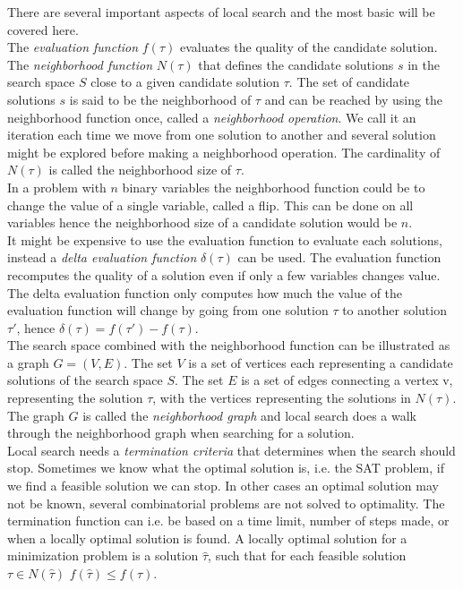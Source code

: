 There are several important aspects of local search and the most basic will be covered here. \\The \emph{evaluation 
function} $f(\tau)$ evaluates the quality of the candidate solution. 
The \emph{neighborhood function} $N(\tau)$ that defines the candidate solutions $s$ in the search space $S$ close to a 
given candidate solution $\tau$. The set of candidate solutions $s$ is said to be the neighborhood of $\tau$ and can be 
reached by using the neighborhood function once, called a \emph{neighborhood operation}. We call it an iteration each 
time we move from 
one solution to another and several solution might be explored before making a neighborhood operation. The cardinality 
of $N(\tau)$ is called the neighborhood size of $\tau$. \\ 
In a problem with $n$ binary variables the neighborhood function could be to change the value of a single variable, 
called a flip. This can be done on all variables hence the neighborhood size of a candidate solution would be $n$. \\ 
It might be expensive to use the evaluation function to evaluate each solutions, instead a \emph{delta evaluation 
function} $\delta(\tau)$ can be used. The evaluation function recomputes the quality of a solution even if only a few 
variables changes value. The delta evaluation function only computes how much the value of the evaluation function will 
change by going from one solution $\tau$ to another solution $\tau'$, hence $\delta(\tau) = f(\tau')-f(\tau)$. \\
The search space combined with the neighborhood function can be illustrated as a graph $G = (V,E)$. The 
set $V$ is a set of vertices each representing a candidate solutions of the search space $S$. The set $E$ is a set of 
edges connecting a vertex v, representing the solution $\tau$, with the vertices representing the solutions 
in $N(\tau)$. The graph $G$ is called the \emph{neighborhood graph} and local search does a walk through the 
neighborhood graph when searching for a solution. \cite[p. 3-5]{lsbog} \\ 
Local search needs a \emph{termination criteria} that determines when the search should stop. Sometimes we know what 
the optimal solution is, i.e. the SAT problem, if we find a feasible solution we can stop. In other cases an optimal 
solution may not be known, several combinatorial problems are not solved to optimality. The termination function can 
i.e. 
be based on a time limit, number of steps made, or when a locally optimal solution is found. A locally optimal solution 
for a minimization problem is a solution $\hat{\tau}$, such that for each feasible solution $\tau \in N(\hat{\tau})$ 
$f(\hat{\tau}) \leq f(\tau)$. \\
